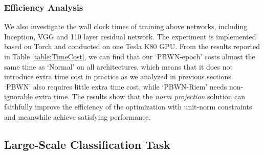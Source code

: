 \documentclass[twocolumn]{article}
\begin{document}
\subsubsection{Efficiency Analysis}
We also investigate the wall clock times of training above networks, including Inception, VGG and 110 layer residual network. The experiment is implemented based on Torch and conducted on one Tesla K80 GPU. From the results reported in Table \ref{table:TimeCost}, we can find that our `PBWN-epoch' costs almost the same time as `Normal' on all architectures, which means that it does not introduce extra time cost in practice as we analyzed in previous sections. `PBWN' also requires little extra time cost, while `PBWN-Riem' needs non-ignorable extra time. The results show that the \emph{norm projection} solution can faithfully improve the efficiency of the optimization with unit-norm constraints and meanwhile achieve satisfying performance.




\subsection{Large-Scale Classification Task}
\end{document}
